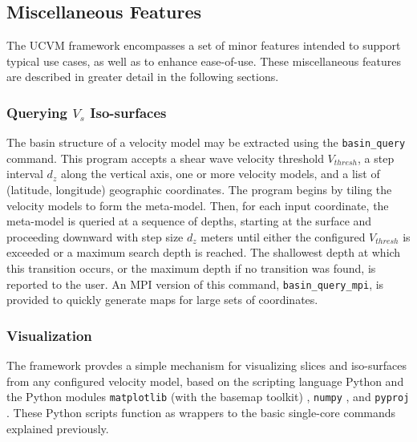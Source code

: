 \subsection{Miscellaneous Features}

The UCVM framework encompasses a set of minor features intended to support typical use cases, as well as to enhance ease-of-use. These miscellaneous features are described in greater detail in the following sections.

\subsubsection{Querying $V_s$ Iso-surfaces}

The basin structure of a velocity model may be extracted using the \texttt{basin\_query} command. This program accepts a shear wave velocity threshold $V_{thresh}$, a step interval $d_z$ along the vertical axis, one or more velocity models, and a list of (latitude, longitude) geographic coordinates. The program begins by tiling the velocity models to form the meta-model. Then, for each input coordinate, the meta-model is queried at a sequence of depths, starting at the surface and proceeding downward with step size $d_z$ meters until either the configured $V_{thresh}$ is exceeded or a maximum search depth is reached. The shallowest depth at which this transition occurs, or the maximum depth if no transition was found, is reported to the user. An MPI version of this command, \texttt{basin\_query\_mpi}, is provided to quickly generate maps for large sets of coordinates.

\subsubsection{Visualization}

The framework provdes a simple mechanism for visualizing slices and iso-surfaces from any configured velocity model, based on the scripting language Python and the Python modules \texttt{matplotlib} (with the basemap toolkit) \citep{Hunter_2007_CSE}, \texttt{numpy} %
, and \texttt{pyproj} %
. These Python scripts function as wrappers to the basic single-core commands explained previously.

